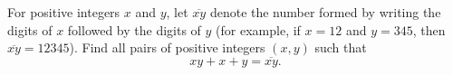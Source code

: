 For positive integers $x$ and $y$, let $\overline{xy}$ denote the number formed by writing the digits of $x$ followed by the digits of $y$ (for example, if $x=12$ and $y=345$, then $\overline{xy}=12345$). Find all pairs of positive integers $(x,y)$ such that
\[xy+x+y=\overline{xy}.\]
